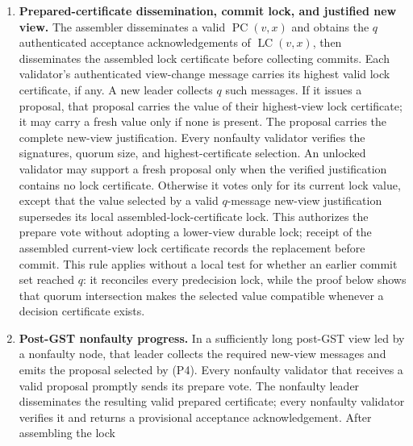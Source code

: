 \begin{definition}
\begin{enumerate}[(P1)]
        fixed fair deterministic rule.  Once the post-\textrm{GST} timeout
        bound of (A1) is active, the pacemaker brings all nonfaulty nodes
        through successive views and reaches a nonfaulty leader within at
        most \(f+1\) consecutive views.
  \item \textbf{Prepared-certificate dissemination, commit lock, and
        justified new view.}
        The assembler disseminates a valid \(\operatorname{PC}(v,x)\) and
        obtains the \(q\) authenticated acceptance acknowledgements of
        \(\operatorname{LC}(v,x)\), then disseminates the assembled lock
        certificate before collecting commits.
        Each validator's authenticated view-change message carries its highest valid
        lock certificate, if any.  A new leader collects \(q\) such
        messages.  If it issues a proposal, that proposal carries the value
        of their highest-view lock certificate; it may carry a fresh
        value only if none is present.  The proposal carries the complete
        new-view justification.
        Every nonfaulty validator verifies the signatures, quorum size, and
        highest-certificate selection.  An unlocked validator may support a
        fresh proposal only when the verified justification contains no
        lock certificate.  Otherwise it votes only for its current lock
        value, except that the value selected by a valid \(q\)-message new-view
        justification supersedes its local assembled-lock-certificate lock.
        This authorizes the prepare vote without adopting a lower-view durable
        lock; receipt of the assembled current-view lock certificate records
        the replacement before commit. This rule applies
        without a local test for whether an earlier commit set reached \(q\):
        it reconciles every predecision lock, while the proof below shows that
        quorum intersection makes the selected value compatible whenever a
        decision certificate exists.
  \item \textbf{Post-\textrm{GST} nonfaulty progress.}
        In a sufficiently long post-\textrm{GST} view led by a nonfaulty
        node, that leader collects the required new-view messages and emits
        the proposal selected by (P4).  Every nonfaulty validator that
        receives a valid proposal promptly sends its prepare vote.  The
        nonfaulty leader disseminates the resulting valid prepared
        certificate; every nonfaulty validator verifies it and returns a
        provisional acceptance acknowledgement. After assembling the lock

\end{enumerate}
\end{definition}
